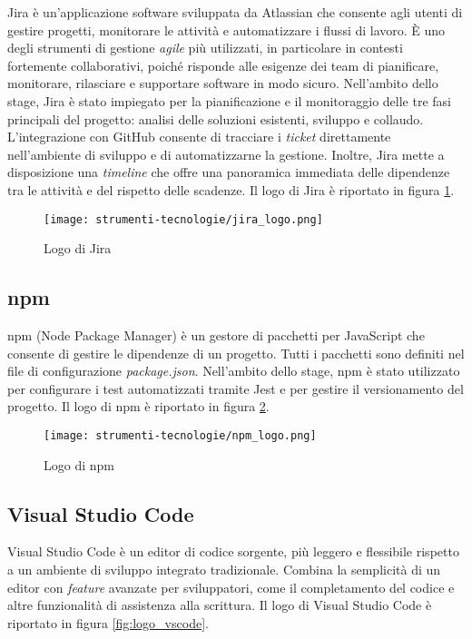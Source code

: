 \par Jira è un'applicazione software sviluppata da Atlassian che consente agli utenti di gestire progetti, monitorare le attività e automatizzare i flussi di lavoro. È uno degli strumenti di gestione \textit{agile} più utilizzati, in particolare in contesti fortemente collaborativi, poiché risponde alle esigenze dei team di pianificare, monitorare, rilasciare e supportare software in modo sicuro. Nell’ambito dello stage, Jira è stato impiegato per la pianificazione e il monitoraggio delle tre fasi principali del progetto: analisi delle soluzioni esistenti, sviluppo e collaudo. L’integrazione con GitHub consente di tracciare i \textit{ticket} direttamente nell’ambiente di sviluppo e di automatizzarne la gestione. Inoltre, Jira mette a disposizione una \textit{timeline} che offre una panoramica immediata delle dipendenze tra le attività e del rispetto delle scadenze. Il logo di Jira è riportato in figura \ref{fig:logo_jira}.

\begin{figure}[H]
  \centering 
  \texttt{[image: strumenti-tecnologie/jira\_logo.png]} 
  \caption{Logo di Jira}
  \label{fig:logo_jira}
\end{figure}

\subsection*{npm}

\par npm (Node Package Manager) è un gestore di pacchetti per JavaScript che consente di gestire le dipendenze di un progetto. Tutti i pacchetti sono definiti nel file di configurazione \textit{package.json}. Nell’ambito dello stage, npm è stato utilizzato per configurare i test automatizzati tramite Jest e per gestire il versionamento del progetto. Il logo di npm è riportato in figura \ref{fig:logo_npm}.

\begin{figure}[H]
  \centering 
  \texttt{[image: strumenti-tecnologie/npm\_logo.png]}
  \caption{Logo di npm}
  \label{fig:logo_npm} 
\end{figure}

\subsection*{Visual Studio Code}

\par Visual Studio Code è un editor di codice sorgente, più leggero e flessibile rispetto a un ambiente di sviluppo integrato tradizionale. Combina la semplicità di un editor con \textit{feature} avanzate per sviluppatori, come il completamento del codice e altre funzionalità di assistenza alla scrittura. Il logo di Visual Studio Code è riportato in figura \ref{fig:logo_vscode}.

